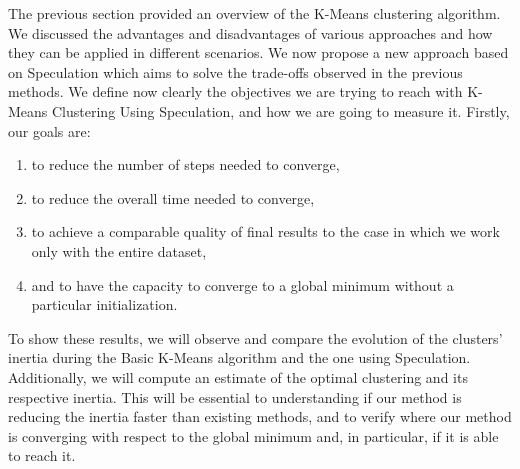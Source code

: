The previous section provided an overview of the K-Means clustering algorithm. We discussed the advantages and disadvantages of various approaches and how they can be applied in different scenarios. We now propose a new approach based on Speculation which aims to solve the trade-offs observed in the previous methods.
We define now clearly the objectives we are trying to reach with K-Means Clustering Using Speculation, and how we are going to measure it.
Firstly, our goals are:
\begin{enumerate}
    \item to reduce the number of steps needed to converge,
    \item to reduce the overall time needed to converge,
    \item to achieve a comparable quality of final results to the case in which we work only with the entire dataset,
    \item and to have the capacity to converge to a global minimum without a particular initialization.
\end{enumerate}
To show these results, we will observe and compare the evolution of the clusters' inertia during the Basic K-Means algorithm and the one using Speculation. Additionally, we will compute an estimate of the optimal clustering and its respective inertia.
This will be essential to understanding if our method is reducing the inertia faster than existing methods, and to verify where our method is converging with respect to the global minimum and, in particular, if it is able to reach it.